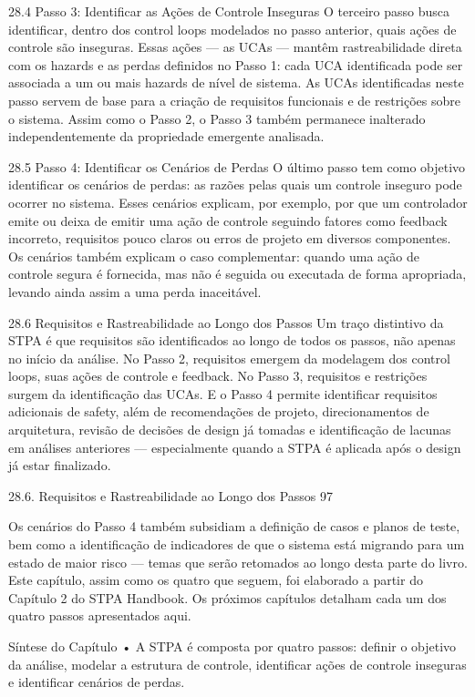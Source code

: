 28.4 Passo 3: Identificar as Ações de Controle Inseguras O terceiro passo busca identificar, dentro dos control loops modelados no passo anterior, quais ações de controle são inseguras. Essas ações — as UCAs — mantêm rastreabilidade direta com os hazards e as perdas definidos no Passo 1: cada UCA identificada pode ser associada a um ou mais hazards de nível de sistema. As UCAs identificadas neste passo servem de base para a criação de requisitos funcionais e de restrições sobre o sistema. Assim como o Passo 2, o Passo 3 também permanece inalterado independentemente da propriedade emergente analisada.

28.5 Passo 4: Identificar os Cenários de Perdas O último passo tem como objetivo identificar os cenários de perdas: as razões pelas quais um controle inseguro pode ocorrer no sistema. Esses cenários explicam, por exemplo, por que um controlador emite ou deixa de emitir uma ação de controle seguindo fatores como feedback incorreto, requisitos pouco claros ou erros de projeto em diversos componentes. Os cenários também explicam o caso complementar: quando uma ação de controle segura é fornecida, mas não é seguida ou executada de forma apropriada, levando ainda assim a uma perda inaceitável.

28.6 Requisitos e Rastreabilidade ao Longo dos Passos Um traço distintivo da STPA é que requisitos são identificados ao longo de todos os passos, não apenas no início da análise. No Passo 2, requisitos emergem da modelagem dos control loops, suas ações de controle e feedback. No Passo 3, requisitos e restrições surgem da identificação das UCAs. E o Passo 4 permite identificar requisitos adicionais de safety, além de recomendações de projeto, direcionamentos de arquitetura, revisão de decisões de design já tomadas e identificação de lacunas em análises anteriores — especialmente quando a STPA é aplicada após o design já estar finalizado.

28.6. Requisitos e Rastreabilidade ao Longo dos Passos 97

Os cenários do Passo 4 também subsidiam a definição de casos e planos de teste, bem como a identificação de indicadores de que o sistema está migrando para um estado de maior risco — temas que serão retomados ao longo desta parte do livro. Este capítulo, assim como os quatro que seguem, foi elaborado a partir do Capítulo 2 do STPA Handbook. Os próximos capítulos detalham cada um dos quatro passos apresentados aqui.

Síntese do Capítulo • A STPA é composta por quatro passos: definir o objetivo da análise, modelar a estrutura de controle, identificar ações de controle inseguras e identificar cenários de perdas.

